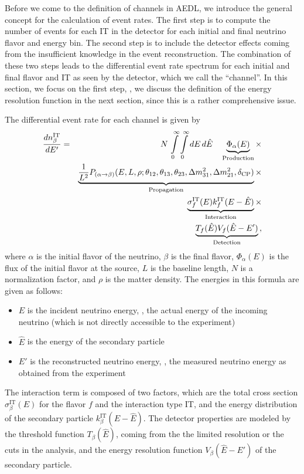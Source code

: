 Before we come to the definition of channels in AEDL, we introduce the general concept for the calculation of event rates. The first step is to
compute the number of events for each IT in the detector for each 
initial and final neutrino flavor and energy bin. The second step is to include the detector effects coming from the insufficient knowledge in the event reconstruction.
The combination of these two steps leads to the differential event rate spectrum for each initial and final flavor and IT as seen by the detector, which we call the ``channel''. In this section, we focus on the
 first step, \ie , we discuss the definition of the energy resolution function in the next section, since this is a rather comprehensive issue.

The differential event rate for each channel is given by
\begin{eqnarray}
\label{eq:master_event}
\frac{dn_{\beta}^{\text{IT}}}{dE'}=&&N\,\int\limits_0^\infty \int\limits_0^\infty dE\,d\hat{E}\quad
\underbrace{\Phi_{\alpha} (E)}_{\mathrm{Production}} \times \nonumber\\
&&\underbrace{\frac{1}{L^2} P_{(\alpha\rightarrow\beta)}(E,L,\rho;\theta_{12},
\theta_{13},\theta_{23},
\Delta m^2_{31},\Delta m^2_{21},\delta_{\mathrm{CP}})}_{\mathrm{Propagation}}
\times \nonumber \\ &&\underbrace{\sigma^{\text{IT}}_f(E)
k_f^{\text{IT}}(E-\hat{E})}_{\mathrm{Interaction}} \times \nonumber \\
&&\underbrace{ T_f(\hat{E}) V_f(\hat{E}-E')}_{\mathrm{Detection}}\,,
\end{eqnarray}
where $\alpha$ is the initial flavor of the neutrino, 
$\beta$ is the final flavor, $\Phi_{\alpha} (E)$ is the flux of the 
initial flavor at the
source, $L$ is the baseline length, $N$ is a normalization factor, and 
$\rho$ is the matter density. The energies in this formula are given as follows:
\begin{itemize}
\item
 $E$ is the incident neutrino energy, \ie, the actual energy of the 
incoming neutrino (which is not directly accessible to the experiment)
\item
 $\hat{E}$ is the energy of the secondary particle
\item
 $E'$ is the reconstructed neutrino energy, \ie, the measured
neutrino energy as obtained from the experiment
\end{itemize}
The interaction term is composed of 
two factors, which are the total cross section 
$\sigma^{\text{IT}}_\beta(E)$ for the flavor $f$ and
the interaction type IT, and the energy distribution of the 
secondary particle $k_\beta^{\text{IT}}(E-\hat{E})$.
The detector properties are 
modeled by the threshold function $T_\beta(\hat{E})$, coming from the the 
limited resolution or the cuts in the analysis, and the energy resolution 
function $V_\beta(\hat{E}-E')$ of the secondary particle. 

